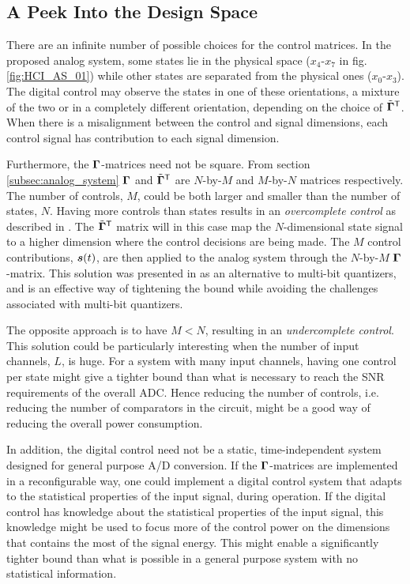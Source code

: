 \subsection{A Peek Into the Design Space}
\label{sec:advanced_DC}
There are an infinite number of possible choices for the control matrices. In the proposed analog system, some states lie in the physical space ($x_4$-$x_7$ in fig. \ref{fig:HCI_AS_01}) while other states are separated from the physical ones ($x_0$-$x_3$). The digital control may observe the states in one of these orientations, a mixture of the two or in a completely different orientation, depending on the choice of $\tilde{\bm{\Gamma}}^\mathsf{T}$. When there is a misalignment between the control and signal dimensions, each control signal has contribution to each signal dimension.

Furthermore, the $\bm{\Gamma}$-matrices need not be square. From section \ref{subsec:analog_system} $\bm{\Gamma}$ and $\tilde{\bm{\Gamma}}^\mathsf{T}$ are $N$-by-$M$ and $M$-by-$N$ matrices respectively. The number of controls, $M$, could be both larger and smaller than the number of states, $N$. Having more controls than states results in an \textit{overcomplete control} as described in \cite{malmberg_thesis}. The $\tilde{\bm{\Gamma}}^\mathsf{T}$ matrix will in this case map the $N$-dimensional state signal to a higher dimension where the control decisions are being made. The $M$ control contributions, $\bm{s}(t)$, are then applied to the analog system through the $N$-by-$M$ $\bm{\Gamma}$-matrix. This solution was presented in \cite{malmberg_thesis} as an alternative to multi-bit quantizers, and is an effective way of tightening the bound while avoiding the challenges associated with multi-bit quantizers.

The opposite approach is to have $M < N$, resulting in an \textit{undercomplete control}. This solution could be particularly interesting when the number of input channels, $L$, is huge. For a system with many input channels, having one control per state might give a tighter bound than what is necessary to reach the SNR requirements of the overall ADC. Hence reducing the number of controls, i.e. reducing the number of comparators in the circuit, might be a good way of reducing the overall power consumption.

In addition, the digital control need not be a static, time-independent system designed for general purpose A/D conversion. If the $\bm{\Gamma}$-matrices are implemented in a reconfigurable way, one could implement a digital control system that adapts to the statistical properties of the input signal, during operation. If the digital control has knowledge about the statistical properties of the input signal, this knowledge might be used to focus more of the control power on the dimensions that contains the most of the signal energy. This might enable a significantly tighter bound than what is possible in a general purpose system with no statistical information.

